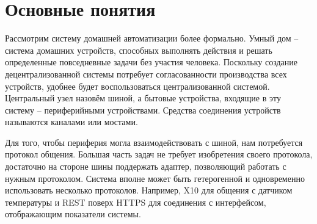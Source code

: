 \section{Основные понятия}

Рассмотрим систему домашней автоматизации более формально.
Умный дом -- система домашних устройств, способных выполнять действия и решать определенные повседневные задачи без участия человека.
Поскольку создание децентрализованной системы потребует согласованности производства всех устройств, удобнее будет воспользоваться централизованной системой.
Центральный узел назовём шиной, а бытовые устройства, входящие в эту систему -- периферийными устройствами.
Средства соединения устройств называются каналами или мостами.

Для того, чтобы периферия могла взаимодействовать с шиной, нам потребуется протокол общения.
Большая часть задач не требует изобретения своего протокола, достаточно на стороне шины поддержать адаптер, позволяющий работать с нужным протоколом.
Система вполне может быть гетерогенной и одновременно использовать несколько протоколов.
Например, X10 для общения с датчиком температуры и REST поверх HTTPS для соединения с интерфейсом, отображающим показатели системы.
